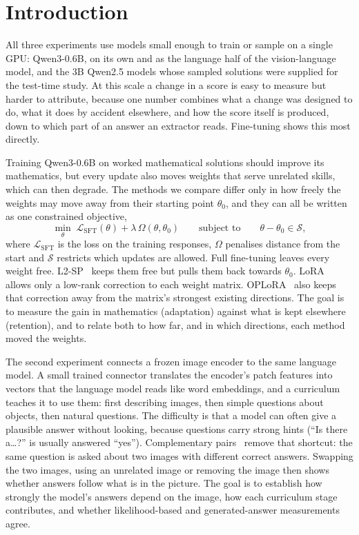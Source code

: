 \section{Introduction}
\label{sec:intro}

All three experiments use models small enough to train or sample on a single GPU: Qwen3-0.6B, on its own and as the language half of the vision-language model, and the 3B Qwen2.5 models whose sampled solutions were supplied for the test-time study. At this scale a change in a score is easy to measure but harder to attribute, because one number combines what a change was designed to do, what it does by accident elsewhere, and how the score itself is produced, down to which part of an answer an extractor reads. Fine-tuning shows this most directly.

Training Qwen3-0.6B on worked mathematical solutions should improve its mathematics, but every update also moves weights that serve unrelated skills, which can then degrade. The methods we compare differ only in how freely the weights may move away from their starting point $\theta_0$, and they can all be written as one constrained objective,
\begin{equation}
\min_{\theta}\;\mathcal{L}_{\mathrm{SFT}}(\theta)+\lambda\,\Omega(\theta,\theta_0)\qquad\text{subject to}\qquad \theta-\theta_0\in\mathcal{S},
\label{eq:ft}
\end{equation}
where $\mathcal{L}_{\mathrm{SFT}}$ is the loss on the training responses, $\Omega$ penalises distance from the start and $\mathcal{S}$ restricts which updates are allowed. Full fine-tuning leaves every weight free. L2-SP~\citep{li2018l2sp} keeps them free but pulls them back towards $\theta_0$. LoRA~\citep{hu2022lora} allows only a low-rank correction to each weight matrix. OPLoRA~\citep{xiong2026oplora} also keeps that correction away from the matrix's strongest existing directions. The goal is to measure the gain in mathematics (adaptation) against what is kept elsewhere (retention), and to relate both to how far, and in which directions, each method moved the weights.

The second experiment connects a frozen image encoder to the same language model. A small trained connector translates the encoder's patch features into vectors that the language model reads like word embeddings, and a curriculum teaches it to use them: first describing images, then simple questions about objects, then natural questions. The difficulty is that a model can often give a plausible answer without looking, because questions carry strong hints (``Is there a\dots?'' is usually answered ``yes''). Complementary pairs~\citep{goyal2017vqav2} remove that shortcut: the same question is asked about two images with different correct answers. Swapping the two images, using an unrelated image or removing the image then shows whether answers follow what is in the picture. The goal is to establish how strongly the model's answers depend on the image, how each curriculum stage contributes, and whether likelihood-based and generated-answer measurements agree.


